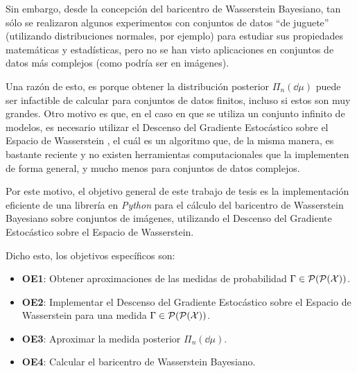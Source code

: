 Sin embargo, desde la concepción del baricentro de Wasserstein Bayesiano, tan sólo se realizaron algunos experimentos con conjuntos de datos ``de juguete'' (utilizando distribuciones normales, por ejemplo) para estudiar sus propiedades matemáticas y estadísticas, pero no se han visto aplicaciones en conjuntos de datos más complejos (como podría ser en imágenes).

Una razón de esto, es porque obtener la distribución posterior $\Pi_n(\dd \mu)$ puede ser infactible de calcular para conjuntos de datos finitos, incluso si estos son muy grandes. Otro motivo es que, en el caso en que se utiliza un conjunto infinito de modelos, es necesario utilizar el Descenso del Gradiente Estocástico sobre el Espacio de Wasserstein \cite{backhoff2022stochastic}, el cuál es un algoritmo que, de la misma manera, es bastante reciente y no existen herramientas computacionales que la implementen de forma general, y mucho menos para conjuntos de datos complejos.

Por este motivo, el objetivo general de este trabajo de tesis es la implementación eficiente de una librería en \emph{Python} para el cálculo del baricentro de Wasserstein Bayesiano sobre conjuntos de imágenes, utilizando el Descenso del Gradiente Estocástico sobre el Espacio de Wasserstein.

Dicho esto, los objetivos específicos son:
\begin{itemize}
    \item \textbf{OE1}: Obtener aproximaciones de las medidas de probabilidad $\Gamma \in \ProbSpace[\ProbSpace[\cX]]$.
    \item \textbf{OE2}: Implementar el Descenso del Gradiente Estocástico sobre el Espacio de Wasserstein para una medida $\Gamma \in \ProbSpace[\ProbSpace[\cX]]$.
    \item \textbf{OE3}: Aproximar la medida posterior $\Pi_n(\dd \mu)$.
    \item \textbf{OE4}: Calcular el baricentro de Wasserstein Bayesiano.
\end{itemize}